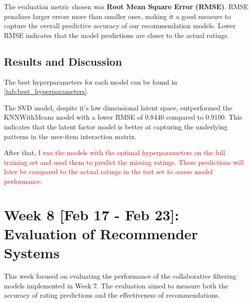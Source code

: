 \documentclass[11pt,a4paper]{article}
\begin{document}
The evaluation metric chosen was \textbf{Root Mean Square Error (RMSE)}. RMSE penalizes larger errors more than smaller ones, making it a good measure to
capture the overall predictive accuracy of our recommendation models.
Lower RMSE indicates that the model predictions are closer to the actual ratings.

\subsection{Results and Discussion}

The best hyperparameters for each model can be found in \autoref{tab:best_hyperparameters}.

\begin{table}[H]
\centering
{}
\caption{Best Hyperparameters and \textcolor{red}{Average} RMSE \textcolor{red}{Across the 5 Folds} for Each Model}
\label{tab:best_hyperparameters}
\end{table}

The SVD model, despite it's low dimensional latent space, outperformed the KNNWithMeans model with a lower RMSE of 0.8440 compared to 0.9100. This indicates that the latent factor model is better at capturing the underlying patterns in the user-item interaction matrix.

After that, \textcolor{red}{I ran the models with the optimal hyperparameters on the full training set and used them to predict the missing ratings. These predictions will later be compared to the actual ratings in the test set to assess model performance.}

\section{Week 8 [Feb 17 - Feb 23]: Evaluation of Recommender Systems}

This week focused on evaluating the performance of the collaborative filtering models implemented in Week 7. The evaluation aimed to measure both the accuracy of rating predictions and the effectiveness of recommendations.
\end{document}
